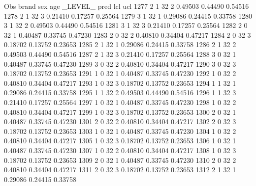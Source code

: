 \documentclass{article}
\begin{document}
\begin{Woutput}
 Obs    brand    sex    age    _LEVEL_      pred       lcl        ucl
1277      2       1      32       2       0.49503    0.44490    0.54516
1278      2       1      32       3       0.21410    0.17257    0.25564
1279      3       1      32       1       0.29086    0.24415    0.33758
1280      3       1      32       2       0.49503    0.44490    0.54516
1281      3       1      32       3       0.21410    0.17257    0.25564
1282      2       0      32       1       0.40487    0.33745    0.47230
1283      2       0      32       2       0.40810    0.34404    0.47217
1284      2       0      32       3       0.18702    0.13752    0.23653
1285      2       1      32       1       0.29086    0.24415    0.33758
1286      2       1      32       2       0.49503    0.44490    0.54516
1287      2       1      32       3       0.21410    0.17257    0.25564
1288      3       0      32       1       0.40487    0.33745    0.47230
1289      3       0      32       2       0.40810    0.34404    0.47217
1290      3       0      32       3       0.18702    0.13752    0.23653
1291      1       0      32       1       0.40487    0.33745    0.47230
1292      1       0      32       2       0.40810    0.34404    0.47217
1293      1       0      32       3       0.18702    0.13752    0.23653
1294      1       1      32       1       0.29086    0.24415    0.33758
1295      1       1      32       2       0.49503    0.44490    0.54516
1296      1       1      32       3       0.21410    0.17257    0.25564
1297      1       0      32       1       0.40487    0.33745    0.47230
1298      1       0      32       2       0.40810    0.34404    0.47217
1299      1       0      32       3       0.18702    0.13752    0.23653
1300      2       0      32       1       0.40487    0.33745    0.47230
1301      2       0      32       2       0.40810    0.34404    0.47217
1302      2       0      32       3       0.18702    0.13752    0.23653
1303      1       0      32       1       0.40487    0.33745    0.47230
1304      1       0      32       2       0.40810    0.34404    0.47217
1305      1       0      32       3       0.18702    0.13752    0.23653
1306      1       0      32       1       0.40487    0.33745    0.47230
1307      1       0      32       2       0.40810    0.34404    0.47217
1308      1       0      32       3       0.18702    0.13752    0.23653
1309      2       0      32       1       0.40487    0.33745    0.47230
1310      2       0      32       2       0.40810    0.34404    0.47217
1311      2       0      32       3       0.18702    0.13752    0.23653
1312      2       1      32       1       0.29086    0.24415    0.33758

\end{Woutput}
\end{document}
